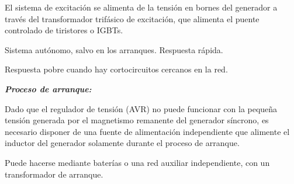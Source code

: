 		
			El sistema de excitación se alimenta de la tensión en bornes del generador a través del transformador trifásico de excitación, que alimenta el puente controlado de tiristores o IGBTs.
		
			
			Sistema autónomo, salvo en los arranques. Respuesta rápida.
			
			
			Respuesta pobre cuando hay cortocircuitos cercanos en la red.
			
			
			\vspace{0.25cm}
			\textbf{\textit{Proceso de arranque:}}
			
			
			Dado que el regulador de tensión (AVR) no puede funcionar con la pequeña tensión generada por el magnetismo remanente del generador síncrono, es necesario disponer de una fuente de alimentación independiente que alimente el inductor del generador solamente durante el proceso de arranque.
			
			
			Puede hacerse mediante baterías o una red auxiliar independiente, con un transformador de arranque.
					
